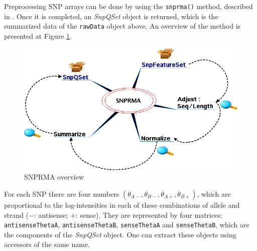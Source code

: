 \documentclass{article}
\newcommand{\Rfunction}[1]{{\texttt{#1}}}
\newcommand{\Robject}[1]{{\texttt{#1}}}
\newcommand{\Rclass}[1]{{\textit{#1}}}
\begin{document}
Preprocessing SNP arrays can be done by using the \Rfunction{snprma()}
method, described in \cite{Carvalho2006}. Once it is completed, an
\Rclass{SnpQSet} object is returned, which is the summarized data of the
\Robject{rawData} object above. An overview of the method is presented
at Figure \ref{snprma}.

\begin{figure}[h]
  \centering
  \includegraphics[scale=.5]{snprma.png}
  \caption{SNPRMA overview}
  \label{snprma}
\end{figure}

For each SNP there are four numbers $(\theta_{A-}, \theta_{B-},
\theta_{A+}, \theta_{B+})$, which are proportional to the
log-intensities in each of these combinations of allele and strand
($-$: antisense; $+$: sense). They are represented by four matrices:
\Robject{antisenseThetaA}, \Robject{antisenseThetaB},
\Robject{senseThetaA} and \Robject{senseThetaB}, which are the
components of the \Rclass{SnpQSet} object. One can extract these
objects using accessors of the same name.
\end{document}
